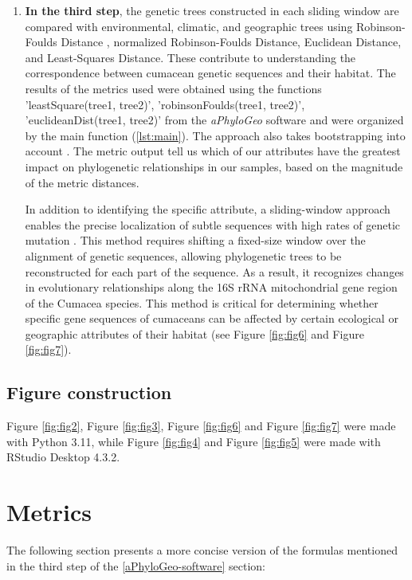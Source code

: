 \begin{enumerate}
\item \textbf{In the third step}, the genetic trees constructed in each sliding window are compared with environmental, climatic, and geographic trees using Robinson-Foulds Distance \citep{robinson_comparison_1981, koshkarov_phylogeography_2022}, normalized Robinson-Foulds Distance, Euclidean Distance, and Least-Squares Distance. These contribute to understanding the correspondence between cumacean genetic sequences and their habitat. The results of the metrics used were obtained using the functions 'leastSquare(tree1, tree2)', 'robinsonFoulds(tree1, tree2)', 'euclideanDist(tree1, tree2)' from the \textit{aPhyloGeo} software and were organized by the main function (\autoref{lst:main}). The approach also takes bootstrapping into account \citep{koshkarov_phylogeography_2022}. The metric output tell us which of our attributes have the greatest impact on phylogenetic relationships in our samples, based on the magnitude of the metric distances. 

In addition to identifying the specific attribute, a sliding-window approach enables the precise localization of subtle sequences with high rates of genetic mutation \citep{koshkarov_phylogeography_2022}. This method requires shifting a fixed-size window over the alignment of genetic sequences, allowing phylogenetic trees to be reconstructed for each part of the sequence. As a result, it recognizes changes in evolutionary relationships along the 16S rRNA mitochondrial gene region of the Cumacea species. This method is critical for determining whether specific gene sequences of cumaceans can be affected by certain ecological or geographic attributes of their habitat (see Figure \ref{fig:fig6} and Figure \ref{fig:fig7}).
\end{enumerate}

\subsection{Figure construction}
Figure \ref{fig:fig2}, Figure \ref{fig:fig3}, Figure \ref{fig:fig6} and Figure \ref{fig:fig7} were made with Python 3.11, while Figure \ref{fig:fig4} and Figure \ref{fig:fig5} were made with RStudio Desktop 4.3.2.

\section{Metrics}\label{metrics}
The following section presents a more concise version of the formulas mentioned in the third step of the \autoref{aPhyloGeo-software} section:

